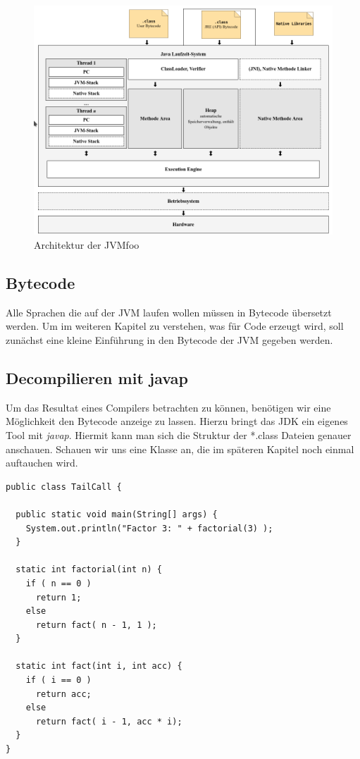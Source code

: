\documentclass[a4paper, 11pt]{article}
\begin{document}
  
  
  \begin{figure}[ht]
  	\centering
  	\includegraphics[width=1\linewidth]{JVM_Arch}
  	\caption{Architektur der JVMfoo}
  	\label{fig:jvmarch}
  \end{figure}

  
  	

  \subsection{Bytecode}
  Alle Sprachen die auf der JVM laufen wollen müssen in Bytecode übersetzt werden. Um im weiteren Kapitel zu verstehen, was für Code erzeugt wird, soll zunächst eine kleine Einführung in den Bytecode der JVM gegeben werden.
  
	\subsection{Decompilieren mit javap}
	Um das Resultat eines Compilers betrachten zu können, benötigen wir eine  Möglichkeit den Bytecode anzeige zu lassen. Hierzu bringt das JDK ein eigenes Tool mit \textit{javap}. Hiermit kann man sich die Struktur der *.class Dateien genauer anschauen. 
	Schauen wir uns eine Klasse an, die im späteren Kapitel noch einmal auftauchen wird.
    \lstset{language=Java}
	\begin{lstlisting}
public class TailCall {

  public static void main(String[] args) {
    System.out.println("Factor 3: " + factorial(3) );
  }

  static int factorial(int n) {
    if ( n == 0 )
      return 1;
    else
      return fact( n - 1, 1 );
  }

  static int fact(int i, int acc) {
    if ( i == 0 )
      return acc;
    else
      return fact( i - 1, acc * i);
  }
}
	\end{lstlisting}
	
\end{document}
